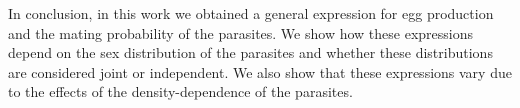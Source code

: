 \documentclass[12pt,a4paper]{article}
\theoremstyle{plain}%
\theoremstyle{definition}
\theoremstyle{remark}
\begin{document}
In conclusion, in this work we obtained a general expression for egg production and the mating probability of the parasites. We show how these expressions depend on the sex distribution of the parasites and whether these distributions are considered joint or independent. 
We also show that these expressions vary due to the effects of the density-dependence of the parasites.
%	
%	
%	
%	
%	
%	
%	
%	
%	
%	
%
%
	
\end{document}

